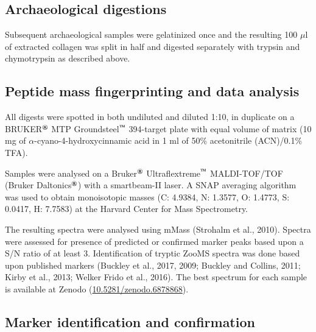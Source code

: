 \documentclass[preprint, 3p, authoryear]{elsarticle} %
\begin{document}
\hypertarget{archaeological-digestions}{%
\subsection{Archaeological digestions}\label{archaeological-digestions}}

Subsequent archaeological samples were gelatinized once and the resulting 100 \(\mu\)l of extracted collagen was split in half and digested separately with trypsin and chymotrypsin as described above.

\hypertarget{peptide-mass-fingerprinting-and-data-analysis}{%
\subsection{Peptide mass fingerprinting and data analysis}\label{peptide-mass-fingerprinting-and-data-analysis}}

All digests were spotted in both undiluted and diluted 1:10, in duplicate on a BRUKER\(^\text{\textregistered}\) MTP Groundsteel\(^\text{\texttrademark}\) 394-target plate with equal volume of matrix (10 mg of \(\alpha\)-cyano-4-hydroxycinnamic acid in 1 ml of 50\% acetonitrile (ACN)/0.1\% TFA).

Samples were analysed on a Bruker\(^\text{\textregistered}\) Ultraflextreme\(^\text{\texttrademark}\) MALDI-TOF/TOF (Bruker Daltonics\(^\text{\textregistered}\)) with a smartbeam-II laser. A SNAP averaging algorithm was used to obtain monoisotopic masses (C: 4.9384, N: 1.3577, O: 1.4773, S: 0.0417, H: 7.7583) at the Harvard Center for Mass Spectrometry.

The resulting spectra were analysed using mMass (Strohalm et al., 2010). Spectra were assessed for presence of predicted or confirmed marker peaks based upon a S/N ratio of at least 3. Identification of tryptic ZooMS spectra was done based upon published markers (Buckley et al., 2017, 2009; Buckley and Collins, 2011; Kirby et al., 2013; Welker Frido et al., 2016). The best spectrum for each sample is available at Zenodo (\href{https://doi.org/doi:10.5281/zenodo.6878868}{10.5281/zenodo.6878868}).

\hypertarget{marker-identification-and-confirmation}{%
\subsection{Marker identification and confirmation}\label{marker-identification-and-confirmation}}
\end{document}
